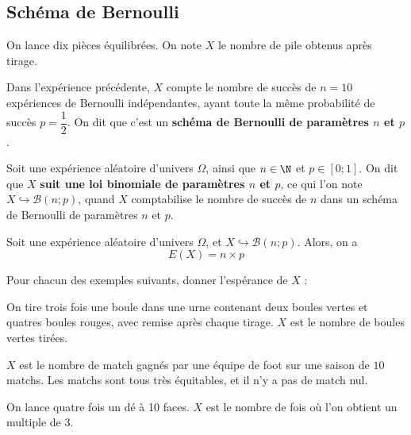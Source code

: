 \documentclass{article}
\begin{document}
\subsection{Schéma de Bernoulli}
\begin{example}
On lance dix pièces équilibrées. On note $X$ le nombre de pile obtenus après tirage.
\end{example}
\begin{tcolorbox}
\begin{remark}
Dans l'expérience précédente, $X$ compte le nombre de succès de $n = 10$ expériences de Bernoulli indépendantes, ayant toute la même probabilité de succès $p = \dfrac{1}{2}$. On dit que c'est un \textbf{schéma de Bernoulli de paramètres $n$ et $p$}.
\end{remark}
\end{tcolorbox}
\begin{tcolorbox}    
\begin{definition}
Soit une expérience aléatoire d'univers $\Omega$, ainsi que $n \in \N$ et $p \in [0;1]$. On dit que $X$ \textbf{suit une loi binomiale de paramètres $n$ et $p$}, ce qui l'on note $X \hookrightarrow \mathcal{B}(n;p)$, quand $X$ comptabilise le nombre de succès de $n$ dans un schéma de Bernoulli de paramètres $n$ et $p$. 
\end{definition}
\end{tcolorbox}
\begin{proposition}
Soit une expérience aléatoire d'univers $\Omega$, et $X \hookrightarrow \mathcal{B}(n;p)$. Alors, on a
\begin{equation*}
E(X) = n \times p
\end{equation*}
\end{proposition}
\begin{example}
Pour chacun des exemples suivants, donner l'espérance de $X$ :
\begin{enumquestions}
\item On tire trois fois une boule dans une urne contenant deux boules vertes et quatres boules rouges, avec remise après chaque tirage. $X$ est le nombre de boules vertes tirées. 
\item $X$ est le nombre de match gagnés par une équipe de foot sur une saison de $10$ matchs. Les matchs sont tous très équitables, et il n'y a pas de match nul.
\item On lance quatre fois un dé à 10 faces. $X$ est le nombre de fois où l'on obtient un multiple de $3$.
\end{enumquestions}
\emptybox{4cm}
\end{example}
\end{document}
